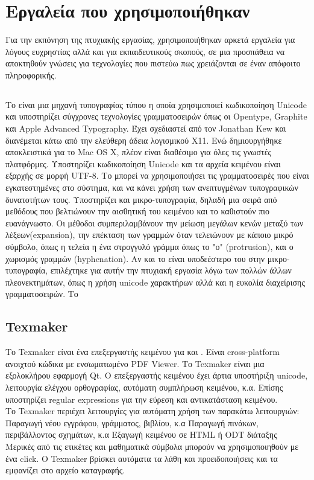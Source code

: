 \section{Εργαλεία που χρησιμοποιήθηκαν}

Για την εκπόνηση της πτυχιακής εργασίας, χρησιμοποιήθηκαν αρκετά εργαλεία για λόγους ευχρηστίας αλλά και για εκπαιδευτικούς σκοπούς, σε μια προσπάθεια να αποκτηθούν γνώσεις για τεχνολογίες που πιστεύω πως χρειάζονται σε έναν απόφοιτο πληροφορικής.\\
\subsection{}
Το  είναι μια μηχανή τυπογραφίας τύπου  η οποία χρησιμοποιεί κωδικοποίηση Unicode και υποστηρίζει σύγχρονες τεχνολογίες γραμματοσειρών όπως οι Opentype, Graphite και Apple Advanced Typography. Έχει σχεδιαστεί από τον Jonathan Kew και διανέμεται κάτω από την ελεύθερη άδεια λογισμικού X11. Ενώ δημιουργήθηκε αποκλειστικά για το Mac OS X, πλέον είναι διαθέσιμο για όλες τις γνωστές πλατφόρμες. Υποστηρίζει κωδικοποίηση Unicode και τα αρχεία κειμένου είναι εξαρχής σε μορφή UTF-8. Το  μπορεί να χρησιμοποιήσει τις γραμματοσειρές που είναι εγκατεστημένες στο σύστημα, και να κάνει χρήση των ανεπτυγμένων τυπογραφικών δυνατοτήτων τους. Υποστηρίζει και μικρο-τυπογραφία, δηλαδή μια σειρά από μεθόδους που βελτιώνουν την αισθητική του κειμένου και το καθιστούν πιο ευανάγνωστο. Οι μέθοδοι συμπεριλαμβάνουν την μείωση μεγάλων κενών μεταξύ των λέξεων(expansion), την επέκταση των γραμμών όταν τελειώνουν με κάποιο μικρό σύμβολο, όπως η τελεία η ένα στρογγυλό γράμμα όπως το "ο" (protrusion), και ο χωρισμός γραμμών (hyphenation). Αν και το  είναι υποδεέστερο του  στην μικρο-τυπογραφία, επιλέχτηκε για αυτήν την πτυχιακή εργασία λόγω των πολλών άλλων πλεονεκτημάτων, όπως η χρήση unicode χαρακτήρων αλλά και η ευκολία διαχείρισης γραμματοσειρών. Το  

\subsection{Texmaker}
Το Texmaker είναι ένα επεξεργαστής κειμένου για  και . Είναι cross-platform ανοιχτού κώδικα με ενσωματωμένο PDF Viewer. Το Texmaker είναι μια εξολοκλήρου εφαρμογή Qt.
O επεξεργαστής κειμένου έχει άρτια υποστήριξη unicode, λειτουργία ελέγχου ορθογραφίας, αυτόματη συμπλήρωση κειμένου, κ.α. Επίσης υποστηρίζει regular expressions για την εύρεση και αντικατάσταση κειμένου.\\
Το Texmaker περιέχει λειτουργίες για αυτόματη χρήση των παρακάτω λειτουργιών:\\
Παραγωγή νέου εγγράφου, γράμματος, βιβλίου, κ.α
Παραγωγή πινάκων, περιβάλλοντος σχημάτων, κ.α
Εξαγωγή κειμένου σε HTML ή ODT διάταξης
\\
Μερικές από τις ετικέτες  και μαθηματικά σύμβολα μπορούν να χρησιμοποιηθούν με ένα click. Ο Texmaker βρίσκει αυτόματα τα λάθη και προειδοποιήσεις και τα εμφανίζει στο αρχείο καταγραφής.\\

